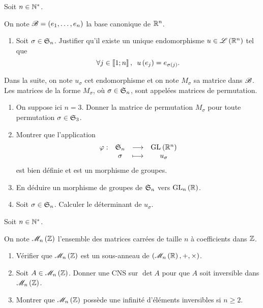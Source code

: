 \begin{exo}[Exercice 15]
Soit \(n\in\Ns\).

On note \(\fami{B}=\paren{e_1,\dots,e_n}\) la base canonique de \(\R^n\).

\begin{enumerate}[series=det15]
\item Soit \(\sigma\in\S{n}\). Justifier qu'il existe un unique endomorphisme \(u\in\Lendo{\R^n}\) tel que \[\quantifs{\forall j\in\interventierii{1}{n}}u\paren{e_j}=e_{\sigma\paren{j}}.\]
\end{enumerate}

Dans la suite, on note \(u_\sigma\) cet endomorphisme et on note \(M_\sigma\) sa matrice dans \(\fami{B}\). Les matrices de la forme \(M_\sigma\), où \(\sigma\in\S{n}\), sont appelées matrices de permutation.

\begin{enumerate}[resume=det15]
\item On suppose ici \(n=3\). Donner la matrice de permutation \(M_\sigma\) pour toute permutation \(\sigma\in\S{3}\). \\

\item Montrer que l'application \[\fonction{\phi}{\S{n}}{\GL{}[\R^n]}{\sigma}{u_\sigma}\] est bien définie et est un morphisme de groupes. \\

\item En déduire un morphisme de groupes de \(\S{n}\) vers \(\GL{n}[\R]\). \\

\item Soit \(\sigma\in\S{n}\). Calculer le déterminant de \(u_\sigma\).
\end{enumerate}
\end{exo}

\begin{corr}
\end{corr}

\begin{exo}[Exercice 16]
Soit \(n\in\Ns\).

On note \(\M{n}[\Z]\) l'ensemble des matrices carrées de taille \(n\) à coefficients dans \(\Z\).

\begin{enumerate}
\item Vérifier que \(\M{n}[\Z]\) est un sous-anneau de \(\anneau{\M{n}[\R]}\). \\

\item Soit \(A\in\M{n}[\Z]\). Donner une CNS sur \(\det A\) pour que \(A\) soit inversible dans \(\M{n}[\Z]\). \\

\item Montrer que \(\M{n}[\Z]\) possède une infinité d'éléments inversibles si \(n\geq2\).
\end{enumerate}
\end{exo}

